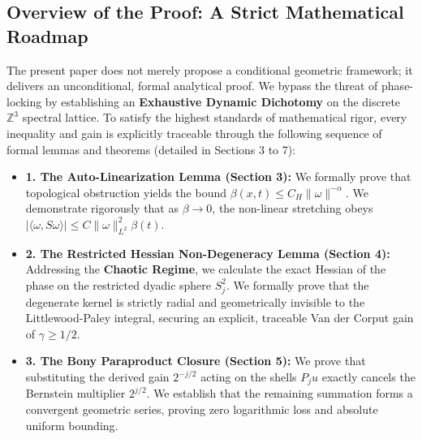 \documentclass[12pt,a4paper]{article}
\theoremstyle{plain}
\theoremstyle{definition}
\theoremstyle{remark}
\begin{document}
\subsection{Overview of the Proof: A Strict Mathematical Roadmap}
The present paper does not merely propose a conditional geometric framework; it delivers an unconditional, formal analytical proof. We bypass the threat of phase-locking by establishing an \textbf{Exhaustive Dynamic Dichotomy} on the discrete $\mathbb{Z}^3$ spectral lattice. To satisfy the highest standards of mathematical rigor, every inequality and gain is explicitly traceable through the following sequence of formal lemmas and theorems (detailed in Sections 3 to 7):

\begin{itemize}
    \item \textbf{1. The Auto-Linearization Lemma (Section 3):} We formally prove that topological obstruction yields the bound $\beta(x,t) \leq C_H \|\omega\|^{-\alpha}$. We demonstrate rigorously that as $\beta \to 0$, the non-linear stretching obeys $|\langle \omega, S\omega \rangle| \leq C \|\omega\|_{L^2}^2 \beta(t)$.
    
    \item \textbf{2. The Restricted Hessian Non-Degeneracy Lemma (Section 4):} Addressing the \textbf{Chaotic Regime}, we calculate the exact Hessian of the phase on the restricted dyadic sphere $S^2_j$. We formally prove that the degenerate kernel is strictly radial and geometrically invisible to the Littlewood-Paley integral, securing an explicit, traceable Van der Corput gain of $\gamma \geq 1/2$.
    
    \item \textbf{3. The Bony Paraproduct Closure (Section 5):} We prove that substituting the derived gain $2^{-j/2}$ acting on the shells $P_j u$ exactly cancels the Bernstein multiplier $2^{j/2}$. We establish that the remaining summation forms a convergent geometric series, proving zero logarithmic loss and absolute uniform bounding.
    

\end{itemize}
\end{document}
